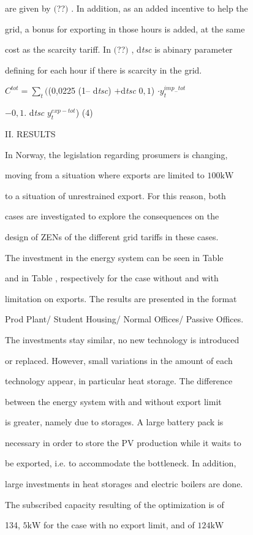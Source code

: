 \documentclass[a4paper,12pt]{article}
\begin{document}
are given by $($??$)$ . In addition, as an added incentive to help the

grid, a bonus for exporting in those hours is added, at the same

cost as the scarcity tariff. In $($??$)$ , d{\it tsc} is abinary parameter

defining for each hour if there is scarcity in the grid.

$C^{tot}=\displaystyle \sum_{t}($($0$,0225 (1-- d{\it tsc}) $+$d{\it tsc} $0,1$) $\cdot y_{t}^{imp_{-}tot}$

$-0, 1$. d{\it tsc} $y_{t}^{exp- tot}$) (4)

II. RESULTS

In Norway, the legislation regarding prosumers is changing,

moving from a situation where exports are limited to $100\mathrm{k}\mathrm{W}$

to a situation of unrestrained export. For this reason, both

cases are investigated to explore the consequences on the

design of ZENs of the different grid tariffs in these cases.

The investment in the energy system can be seen in Table

and in Table , respectively for the case without and with

limitation on exports. The results are presented in the format

Prod Plant/ Student Housing/ Normal Offices/ Passive Offices.

The investments stay similar, no new technology is introduced

or replaced. However, small variations in the amount of each

technology appear, in particular heat storage. The difference

between the energy system with and without export limit

is greater, namely due to storages. A large battery pack is

necessary in order to store the PV production while it waits to

be exported, i.e. to accommodate the bottleneck. In addition,

large investments in heat storages and electric boilers are done.

The subscribed capacity resulting of the optimization is of

134, $5\mathrm{k}\mathrm{W}$ for the case with no export limit, and of $124\mathrm{k}\mathrm{W}$
\end{document}
